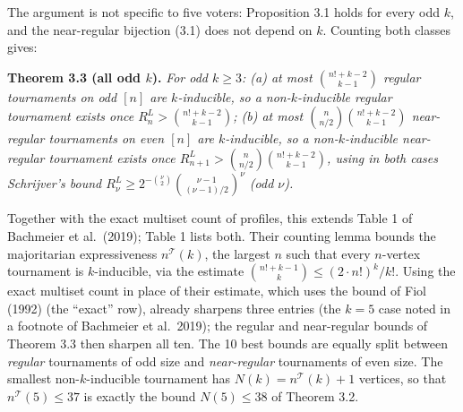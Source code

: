 \documentclass[
]{article}
\begin{document}
The argument is not specific to five voters: Proposition 3.1 holds for
every odd \(k\), and the near-regular bijection (3.1) does not depend on
\(k\). Counting both classes gives:

\textbf{Theorem 3.3 (all odd \(k\)).} \emph{For odd \(k \ge 3\): (a) at
most \(\binom{n! + k - 2}{k - 1}\) regular tournaments on odd \([n]\)
are \(k\)-inducible, so a non-\(k\)-inducible regular tournament exists
once \(R^{L}_{n} > \binom{n! + k - 2}{k - 1}\); (b) at most
\(\binom{n}{n/2}\binom{n! + k - 2}{k - 1}\) near-regular tournaments on
even \([n]\) are \(k\)-inducible, so a non-\(k\)-inducible near-regular
tournament exists once
\(R^{L}_{n+1} > \binom{n}{n/2}\binom{n! + k - 2}{k - 1}\), using in both
cases Schrijver's bound
\(R^{L}_{\nu} \ge 2^{-\binom{\nu}{2}}\binom{\nu-1}{(\nu-1)/2}^{\nu}\)
(odd \(\nu\)).}

Together with the exact multiset count of profiles, this extends Table 1
of Bachmeier et al.~(2019); Table 1 lists both. Their counting lemma
bounds the majoritarian expressiveness \(n^{\mathcal{T}}(k)\), the
largest \(n\) such that every \(n\)-vertex tournament is
\(k\)-inducible, via the estimate
\(\binom{n! + k - 1}{k} \le (2 \cdot n!)^k / k!\). Using the exact
multiset count in place of their estimate, which uses the bound of Fiol
(1992) (the ``exact'' row), already sharpens three entries (the
\(k = 5\) case noted in a footnote of Bachmeier et al.~2019); the
regular and near-regular bounds of Theorem 3.3 then sharpen all ten. The
10 best bounds are equally split between \emph{regular} tournaments of
odd size and \emph{near-regular} tournaments of even size. The smallest
non-\(k\)-inducible tournament has \(N(k) = n^{\mathcal{T}}(k) + 1\)
vertices, so that \(n^{\mathcal{T}}(5) \le 37\) is exactly the bound
\(N(5) \le 38\) of Theorem 3.2.
\end{document}
